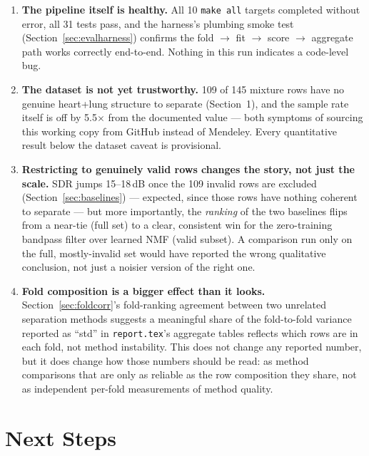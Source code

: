 \documentclass[11pt]{article}
\begin{document}
\begin{enumerate}
  \item \textbf{The pipeline itself is healthy.} All 10 \texttt{make all}
    targets completed without error, all 31 tests pass, and the harness's
    plumbing smoke test (Section~\ref{sec:evalharness}) confirms the fold
    $\to$ fit $\to$ score $\to$ aggregate path works correctly end-to-end.
    Nothing in this run indicates a code-level bug.
  \item \textbf{The dataset is not yet trustworthy.} 109 of 145 mixture rows
    have no genuine heart+lung structure to separate (Section~1), and the
    sample rate itself is off by 5.5$\times$ from the documented value ---
    both symptoms of sourcing this working copy from GitHub instead of
    Mendeley. Every quantitative result below the dataset caveat is
    provisional.
  \item \textbf{Restricting to genuinely valid rows changes the story, not
    just the scale.} SDR jumps 15--18\,dB once the 109 invalid rows are
    excluded (Section~\ref{sec:baselines}) --- expected, since those rows
    have nothing coherent to separate --- but more importantly, the
    \emph{ranking} of the two baselines flips from a near-tie (full set) to
    a clear, consistent win for the zero-training bandpass filter over
    learned NMF (valid subset). A comparison run only on the full,
    mostly-invalid set would have reported the wrong qualitative
    conclusion, not just a noisier version of the right one.
  \item \textbf{Fold composition is a bigger effect than it looks.}
    Section~\ref{sec:foldcorr}'s fold-ranking agreement between two
    unrelated separation methods suggests a meaningful share of the
    fold-to-fold variance reported as ``std'' in \texttt{report.tex}'s
    aggregate tables reflects which rows are in each fold, not method
    instability. This does not change any reported number, but it does
    change how those numbers should be read: as method comparisons that are
    only as reliable as the row composition they share, not as independent
    per-fold measurements of method quality.
\end{enumerate}

\section{Next Steps}
\end{document}
